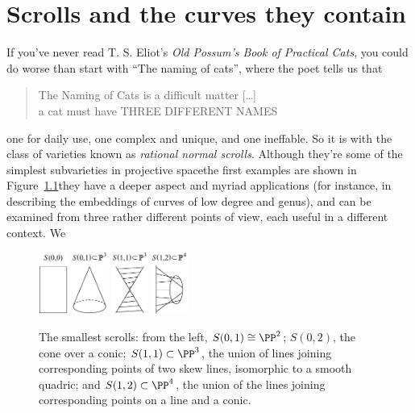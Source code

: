 
\chapter{Scrolls and the curves they contain}
\label{ScrollsChapter}

If you've never read T. S. Eliot's {\it Old Possum's Book of Practical Cats}, 
you could do worse than start with ``The naming of cats'',
where the poet tells us that
\begin{quote}%
The Naming of Cats is a difficult matter [\dots]\\
a cat must have THREE DIFFERENT NAMES
\end{quote}%

\noindent %
\emdash one for daily use, one complex and unique, and one ineffable.
So it is with the class of varieties
%
%
%
known as \emph{rational normal scrolls}. Although they're some of the
%
%
simplest subvarieties in projective space\emdash the first examples
are shown in Figure~\ref{Fig16.1}\emdash they have a deeper aspect and
myriad applications (for instance, in describing the embeddings of
curves of low degree and genus), and can be examined from three rather
different points of view, each useful in a different context. We
%
\begin{figure}[h]
\includegraphics[height=0.8in,trim=0 0 0 15,clip]{main/Fig16-1A}\qquad
\includegraphics[height=0.8in,trim=0 0 0 15,clip]{main/Fig16-1B}\qquad
\includegraphics[height=0.8in,trim=0 0 0 15,clip]{main/Fig16-1C}\qquad
\includegraphics[height=0.8in,trim=0 0 0 15,clip]{main/Fig16-1D-new}%
\caption{The smallest scrolls: from the left, $S(0,1) \cong \PP^{2}$;
$S(0,2)$, the cone over a conic; $S(1,1)\subset \PP^{3}$, the union of
lines joining corresponding points of two skew lines, isomorphic to a
smooth quadric; and $S(1,2)\subset \PP^{4}$, the union of the lines
joining corresponding points on a line and a conic.
\vspace*{-10pt}
}
\label{Fig16.1}
\end{figure}
